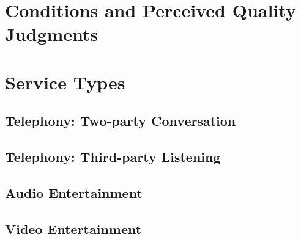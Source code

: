 
\section{Conditions and Perceived Quality Judgments}

\section{Service Types}

\subsection{Telephony: Two-party Conversation}

\subsection{Telephony: Third-party Listening}

\subsection{Audio Entertainment}

\subsection{Video Entertainment}
